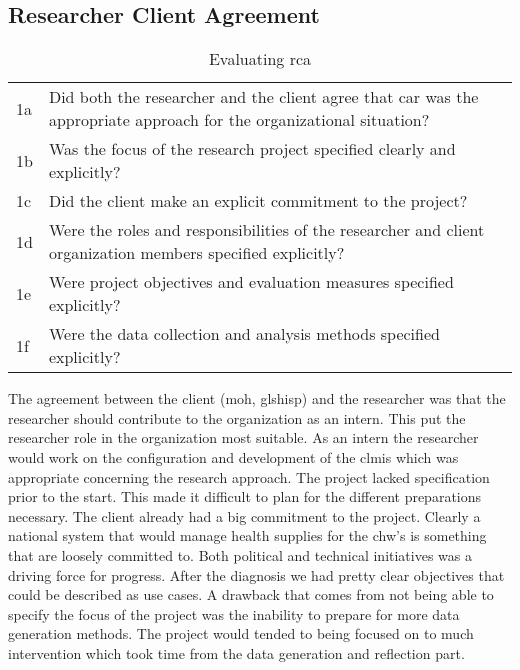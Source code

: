 \subsection{Researcher Client Agreement}
\begin{table}[h]
\centering
\begin{tabular}{p{2cm} p{8cm}}
\hline
1a & Did both the researcher and the client agree that \gls{car} was the appropriate approach for the organizational situation? \\
1b & Was the focus of the research project specified clearly and explicitly? \\
1c & Did the client make an explicit commitment to the project? \\
1d & Were the roles and responsibilities of the researcher and client organization members specified explicitly? \\
1e & Were project objectives and evaluation measures specified explicitly? \\
1f & Were the data collection and analysis methods specified explicitly? \\
\hline
\end{tabular}
\caption{Evaluating \gls{rca}}
\label{tab:evarca}
\end{table}
The agreement between the client (\gls{moh}, gls{hisp}) and the researcher was that the researcher should contribute to the organization as an intern.
This put the researcher role in the organization most suitable. 
As an intern the researcher would work on the configuration and development of the \gls{clmis} which was appropriate concerning the research approach. The project lacked specification prior to the start. This made it difficult to plan for the different preparations necessary.
The client already had a big commitment to the project. 
Clearly a national system that would manage health supplies for the \gls{chw}'s is something that are loosely committed to. 
Both political and technical initiatives was a driving force for progress. 
After the diagnosis we had pretty clear objectives that could be described as use cases.
A drawback that comes from not being able to specify the focus of the project was the inability to prepare for more data generation methods.
The project would tended to being focused on to much intervention which took time from the data generation and reflection part.

\newpage
